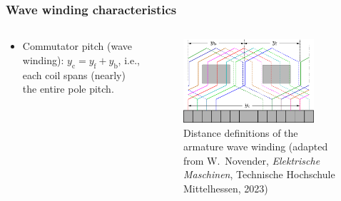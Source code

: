 \begin{frame}
	\frametitle{Wave winding characteristics}
    \begin{columns}
		\begin{column}{0.42\textwidth}
            \begin{itemize}
				\item Commutator pitch (wave winding): $y_\mathrm{c} = y_\mathrm{f} + y_\mathrm{b}$, i.e., each coil spans (nearly) the entire pole pitch.  
			\end{itemize}
			\vspace{-0.4cm}
		\end{column}
        \hfill
		\begin{column}{0.55\textwidth}
			\begin{figure}
				\centering
				\includegraphics[width=0.85\textwidth]{fig/lec03/Wave_winding_distances.pdf}
				\caption{Distance definitions of the armature wave winding (adapted from W.~Novender, \textit{Elektrische Maschinen}, Technische Hochschule Mittelhessen, 2023)}
				\label{fig:Wave_winding_distances}
			\end{figure}
		\end{column}
		\end{columns}
\end{frame}

